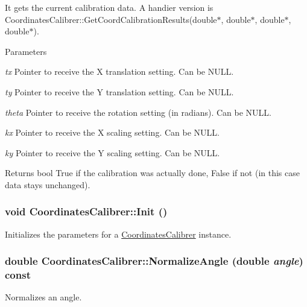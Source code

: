It gets the current calibration data. A handier version is CoordinatesCalibrer::GetCoordCalibrationResults(double$\ast$, double$\ast$, double$\ast$, double$\ast$). 


\begin{DoxyParams}{Parameters}
\item[{\em tx}]Pointer to receive the X translation setting. Can be NULL. \item[{\em ty}]Pointer to receive the Y translation setting. Can be NULL. \item[{\em theta}]Pointer to receive the rotation setting (in radians). Can be NULL. \item[{\em kx}]Pointer to receive the X scaling setting. Can be NULL. \item[{\em ky}]Pointer to receive the Y scaling setting. Can be NULL. \end{DoxyParams}
\begin{DoxyReturn}{Returns}
bool True if the calibration was actually done, False if not (in this case data stays unchanged). 
\end{DoxyReturn}
\hypertarget{classCoordinatesCalibrer_a19faab9e443f7ef64462a36c19baf6bc}{
\subsubsection[{Init}]{\setlength{\rightskip}{0pt plus 5cm}void CoordinatesCalibrer::Init ()}}
\label{classCoordinatesCalibrer_a19faab9e443f7ef64462a36c19baf6bc}


Initializes the parameters for a \hyperlink{classCoordinatesCalibrer}{CoordinatesCalibrer} instance. 

\hypertarget{classCoordinatesCalibrer_acae6b5f07cf198f9c85a1b09e9a275dc}{
\subsubsection[{NormalizeAngle}]{\setlength{\rightskip}{0pt plus 5cm}double CoordinatesCalibrer::NormalizeAngle (double {\em angle}) const}}
\label{classCoordinatesCalibrer_acae6b5f07cf198f9c85a1b09e9a275dc}


Normalizes an angle. 


